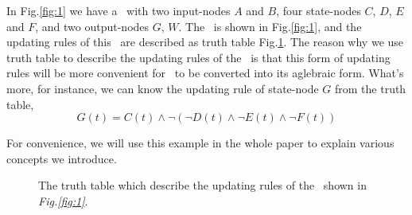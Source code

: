 \begin{example}
	In Fig.\ref{fig:1} we have a \BCN\ with two input-nodes $A$ and $B$, four state-nodes $C$, $D$, $E$ and $F$, and two output-nodes $G$, $W$. The \BCN\ is shown in Fig.\ref{fig:1}, and the updating rules of this \BCN\ are described as truth table Fig.\ref{fig:2}. The reason why we use truth table to describe the updating rules of the \BCN\ is that this form of updating rules will be more convenient for \BCN\ to be converted into its aglebraic form. What's more, for instance, we can know the updating rule of state-node $G$ from the truth table,
	\[G(t)=C(t)\wedge \neg(\neg{D(t)}\wedge \neg E(t)\wedge \neg F(t))\]
	
	For convenience, we will use this example in the whole paper to explain various concepts we introduce.
  \begin{figure}[thpb]
      \centering
      
      \caption{The truth table which describe the updating rules of the \BCN\ shown in {\em Fig.\ref{fig:1}}.}
      \label{fig:2}
   \end{figure}
\end{example}   


